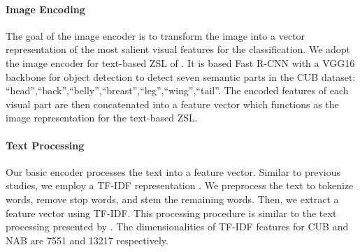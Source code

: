 \documentclass[11pt,a4paper]{article}
\begin{document}
\paragraph{Image Encoding}
\label{section:Image_Encoder}
The goal of the image encoder is to transform the image into a vector representation of the most salient visual features for the classification. 
We adopt the image encoder for text-based ZSL of \citet{zhang2016spda, zhu2018generative,elhoseiny2017link}. It is based Fast R-CNN with \citep{girshick2015fast} a VGG16 backbone for object detection to detect seven semantic parts in the CUB dataset:
\enquote{head},\enquote{back},\enquote{belly},\enquote{breast},\enquote{leg},\enquote{wing},\enquote{tail}. 
The encoded features of each visual part are then concatenated into a feature vector which functions as the image representation for the text-based ZSL.




\paragraph{Text Processing}
\label{section:Text_Encoder}
Our basic encoder processes the text into a feature vector. Similar to previous studies, we employ a TF-IDF representation \citep{salton1988term}. %
We preprocess the text to tokenize words, remove stop words, and stem the remaining words. Then, we extract a feature vector using TF-IDF. This processing procedure is similar to the text processing presented by \citet{zhu2018generative}.
The dimensionalities of TF-IDF features for CUB and NAB are 7551 and 13217 respectively. 
\end{document}
